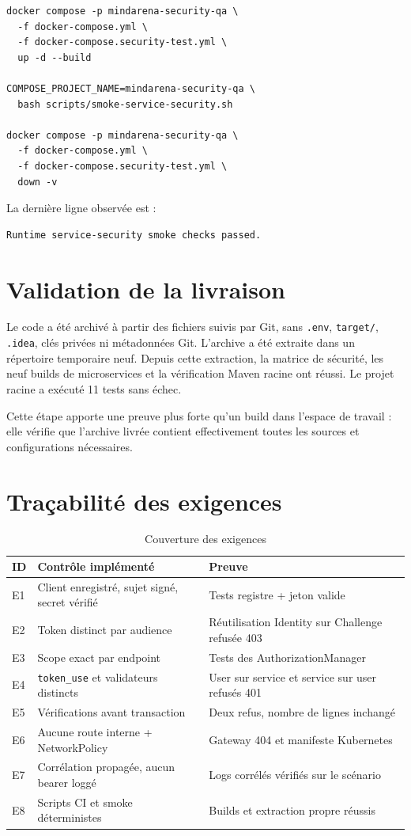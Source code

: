 \documentclass[12pt,a4paper,oneside]{report}
\newcommand{\code}[1]{\texttt{#1}}
\begin{document}
\begin{lstlisting}[caption={Exécution du scénario complet},label={lst:runtime}]
docker compose -p mindarena-security-qa \
  -f docker-compose.yml \
  -f docker-compose.security-test.yml \
  up -d --build

COMPOSE_PROJECT_NAME=mindarena-security-qa \
  bash scripts/smoke-service-security.sh

docker compose -p mindarena-security-qa \
  -f docker-compose.yml \
  -f docker-compose.security-test.yml \
  down -v
\end{lstlisting}

La dernière ligne observée est :
\begin{lstlisting}
Runtime service-security smoke checks passed.
\end{lstlisting}

\section{Validation de la livraison}
Le code a été archivé à partir des fichiers suivis par Git, sans \code{.env},
\code{target/}, \code{.idea}, clés privées ni métadonnées Git. L'archive a été
extraite dans un répertoire temporaire neuf. Depuis cette extraction, la matrice
de sécurité, les neuf builds de microservices et la vérification Maven racine ont
réussi. Le projet racine a exécuté 11 tests sans échec.

Cette étape apporte une preuve plus forte qu'un build dans l'espace de travail :
elle vérifie que l'archive livrée contient effectivement toutes les sources et
configurations nécessaires.

\section{Traçabilité des exigences}
\begin{table}[H]
\centering
\caption{Couverture des exigences}
\label{tab:traceability}
\small
\begin{tabularx}{\textwidth}{P{1.4cm}Y Y}
\toprule
\textbf{ID} & \textbf{Contrôle implémenté} & \textbf{Preuve} \\
\midrule
E1 & Client enregistré, sujet signé, secret vérifié & Tests registre + jeton valide \\
E2 & Token distinct par audience & Réutilisation Identity sur Challenge refusée 403 \\
E3 & Scope exact par endpoint & Tests des AuthorizationManager \\
E4 & \code{token\_use} et validateurs distincts & User sur service et service sur user refusés 401 \\
E5 & Vérifications avant transaction & Deux refus, nombre de lignes inchangé \\
E6 & Aucune route interne + NetworkPolicy & Gateway 404 et manifeste Kubernetes \\
E7 & Corrélation propagée, aucun bearer loggé & Logs corrélés vérifiés sur le scénario \\
E8 & Scripts CI et smoke déterministes & Builds et extraction propre réussis \\
\bottomrule
\end{tabularx}
\end{table}
\end{document}
